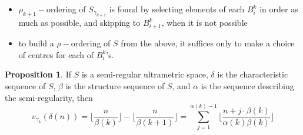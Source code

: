 \documentclass{beamer}
\theoremstyle{definition}
\newtheorem{proposition}{Proposition}
\begin{document}
\begin{frame}
	\tikzset{font=\tiny,
	level distance=1.35cm,
}

\begin{center}
\end{center}
\end{frame}

\begin{frame}

	\begin{itemize}
		\item $\rho_{k+1}-$ordering of $S_{\gamma_{k+1}}$ is found by selecting elements of each $B^k_i$ in order as much as possible, and skipping to $B^k_{i+1}$, when it is not possible
		\item  to build a $\rho-$ordering of $S$ from the above, it suffices only to make a choice of centres for each of $B^k_i$'s.
	\end{itemize}
\end{frame}


\begin{frame}
\begin{proposition}
	If $S$ is a semi-regular ultrametric space, $\delta$ is the characteristic sequence of $S$, $\beta$ is the structure sequence of $S$, and $\alpha$ is the sequence describing the semi-regularity, then
	\[v_{\gamma_k}(\delta(n)) =  \lfloor\frac{n}{\beta(k)}\rfloor - \lfloor\frac{n}{\beta(k+1)}\rfloor = \sum_{j=1}^{\alpha(k)-1} \lfloor \frac{n + j\cdot \beta(k)}{\alpha(k)\beta(k)} \rfloor\]
\end{proposition}

\end{frame}
\end{document}
